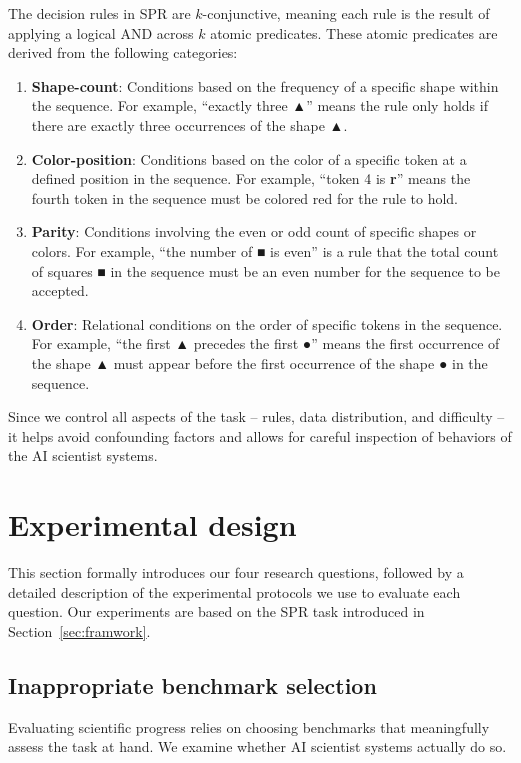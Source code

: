 \documentclass[10pt]{article}
\begin{document}
The decision rules in SPR are $k$-conjunctive, meaning each rule is the result of applying a logical AND across $k$ atomic predicates. These atomic predicates are derived from the following categories:
    \begin{enumerate}
        \item \textbf{Shape-count}: Conditions based on the frequency of a specific shape within the sequence. For example, ``exactly three ▲'' means the rule only holds if there are exactly three occurrences of the shape ▲.

        \item \textbf{Color-position}: Conditions based on the color of a specific token at a defined position in the sequence. For example, ``token 4 is \textbf{r}'' means the fourth token in the sequence must be colored red for the rule to hold.

        \item \textbf{Parity}: Conditions involving the even or odd count of specific shapes or colors. For example, ``the number of ■ is even'' is a rule that the total count of squares ■ in the sequence must be an even number for the sequence to be accepted. 

        \item \textbf{Order}: Relational conditions on the order of specific tokens in the sequence. For example, ``the first ▲ precedes the first ●'' means the first occurrence of the shape ▲ must appear before the first occurrence of the shape ● in the sequence.
    \end{enumerate} 
Since we control all aspects of the task -- rules, data distribution, and difficulty -- it helps avoid confounding factors and allows for careful inspection of behaviors of the AI scientist systems. 

\section{Experimental design}
\label{sec:experimental_design}

This section formally introduces our four research questions, followed by a detailed description of the experimental protocols we use to evaluate each question. Our experiments are based on the SPR task introduced in Section~\ref{sec:framwork}.

\subsection{Inappropriate benchmark selection}
\label{sec:IBS}
Evaluating scientific progress relies on choosing benchmarks that meaningfully assess the task at hand. We examine whether AI scientist systems actually do so.
\end{document}
